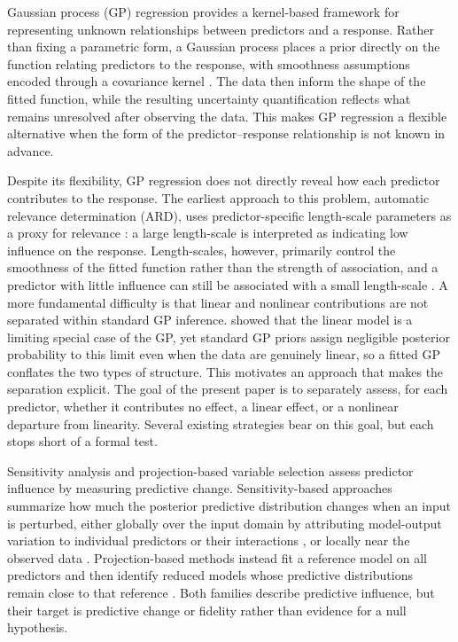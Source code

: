 \documentclass{article}
\begin{document}
Gaussian process (GP) regression \parencite{williams2006gaussian} provides a kernel-based framework for representing unknown relationships between predictors and a response. Rather than fixing a parametric form, a Gaussian process places a prior directly on the function relating predictors to the response, with smoothness assumptions encoded through a covariance kernel \parencite{Williams1996}. The data then inform the shape of the fitted function, while the resulting uncertainty quantification reflects what remains unresolved after observing the data. This makes GP regression a flexible alternative when the form of the predictor--response relationship is not known in advance.

Despite its flexibility, GP regression does not directly reveal how each predictor contributes to the response. The earliest approach to this problem, automatic relevance determination (ARD), uses predictor-specific length-scale parameters as a proxy for relevance \parencite{mackay1992bayesian, neal1995bayesian}: a large length-scale is interpreted as indicating low influence on the response. Length-scales, however, primarily control the smoothness of the fitted function rather than the strength of association, and a predictor with little influence can still be associated with a small length-scale \parencite{linkletter2006variable, nakajima2007theoretical, piironen2016projection}. A more fundamental difficulty is that linear and nonlinear contributions are not separated within standard GP inference. \textcite{gramacyGaussianProcessesLimiting2008} showed that the linear model is a limiting special case of the GP, yet standard GP priors assign negligible posterior probability to this limit even when the data are genuinely linear, so a fitted GP conflates the two types of structure. This motivates an approach that makes the separation explicit. The goal of the present paper is to separately assess, for each predictor, whether it contributes no effect, a linear effect, or a nonlinear departure from linearity. Several existing strategies bear on this goal, but each stops short of a formal test.

Sensitivity analysis and projection-based variable selection assess predictor influence by measuring predictive change. Sensitivity-based approaches summarize how much the posterior predictive distribution changes when an input is perturbed, either globally over the input domain by attributing model-output variation to individual predictors or their interactions \parencite{oakley2004probabilistic}, or locally near the observed data \parencite{paananen2019variable}. Projection-based methods instead fit a reference model on all predictors and then identify reduced models whose predictive distributions remain close to that reference \parencite{piironen2016projection}. Both families describe predictive influence, but their target is predictive change or fidelity rather than evidence for a null hypothesis.
\end{document}
